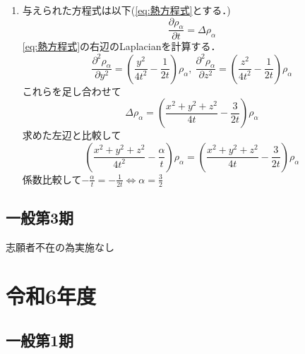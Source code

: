 \documentclass[dvipdfmx]{jsreport}
\begin{document}
\begin{souanswer}
\begin{enumerate}
	\item 与えられた方程式は以下(\eqref{eq:熱方程式}とする．)
\begin{equation} \tag{H}\label{eq:熱方程式}
	\frac{\partial \rho_\alpha}{\partial t}= \Delta\rho_\alpha
\end{equation}
	\eqref{eq:熱方程式}の右辺のLaplacianを計算する．
\begin{equation*}
	\frac{\partial^2 \rho_\alpha}{\partial y^2}= \left(\frac{y^2}{4t^2}- \frac{1}{2t}\right)\rho_\alpha,\ 
	\frac{\partial^2 \rho_\alpha}{\partial z^2}= \left(\frac{z^2}{4t^2}- \frac{1}{2t}\right)\rho_\alpha
\end{equation*}
	これらを足し合わせて
\begin{equation*}
	\Delta\rho_\alpha= \left(\frac{x^2+ y^2+ z^2}{4t}- \frac{3}{2t}\right)\rho_\alpha
\end{equation*}
	求めた左辺と比較して
\begin{equation*}
	\left(\frac{x^2+ y^2+ z^2}{4t^2}- \frac{\alpha}{t}\right)\rho_\alpha= \left(\frac{x^2+ y^2+ z^2}{4t}- \frac{3}{2t}\right)\rho_\alpha
\end{equation*}
	係数比較して$-\frac{\alpha}{t}= -\frac{1}{2t}\iff \alpha= \frac{3}{2}$
\end{enumerate}
\end{souanswer}
\chapter{一般第3期}
	志願者不在の為実施なし

\part{令和6年度}
\chapter{一般第1期}
\end{document}
